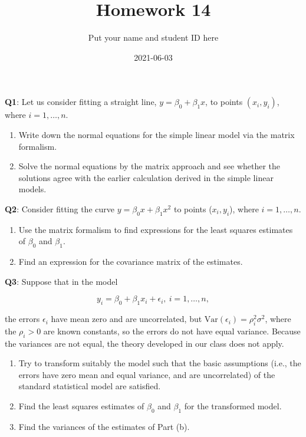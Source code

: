 \documentclass[]{article}
\title{Homework 14}
\author{Put your name and student ID here}
\date{2021-06-03}
\begin{document}
\maketitle

\textbf{Q1}: Let us consider fitting a straight line,
\(y = \beta_0+\beta_1x\), to points \((x_i,y_i)\), where
\(i=1,\dots,n\).

\begin{enumerate}
\def\labelenumi{\arabic{enumi}.}
\item
  Write down the normal equations for the simple linear model via the
  matrix formalism.
\item
  Solve the normal equations by the matrix approach and see whether the
  solutions agree with the earlier calculation derived in the simple
  linear models.
\end{enumerate}

\textbf{Q2}: Consider fitting the curve \(y = \beta_0x+\beta_1x^2\) to
points (\(x_i,y_i\)), where \(i = 1,\dots,n\).

\begin{enumerate}
\def\labelenumi{\arabic{enumi}.}
\item
  Use the matrix formalism to find expressions for the least squares
  estimates of \(\beta_0\) and \(\beta_1\).
\item
  Find an expression for the covariance matrix of the estimates.
\end{enumerate}

\textbf{Q3}: Suppose that in the model

\[y_i= \beta_0+\beta_1x_i+\epsilon_i,\ i=1,\dots,n,\]

the errors \(\epsilon_i\) have mean zero and are uncorrelated, but
\(\mathrm{Var}(\epsilon_i) = \rho_i^2\sigma^2\), where the \(\rho_i>0\)
are known constants, so the errors do not have equal variance. Because
the variances are not equal, the theory developed in our class does not
apply.

\begin{enumerate}
\def\labelenumi{(\alph{enumi})}
\item
  Try to transform suitably the model such that the basic assumptions
  (i.e., the errors have zero mean and equal variance, and are
  uncorrelated) of the standard statistical model are satisfied.
\item
  Find the least squares estimates of \(\beta_0\) and \(\beta_1\) for
  the transformed model.
\item
  Find the variances of the estimates of Part (b).
\end{enumerate}
\end{document}
